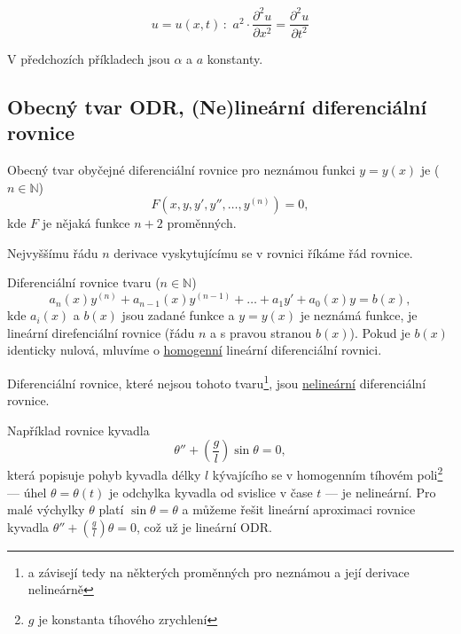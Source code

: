 \documentclass[../main.tex]{subfiles}
\begin{document}
\begin{example}
    \[ u = u(x,t)\, : \,\, a^2\cdot \frac{\partial^2 u}{\partial x^2} = \frac{\partial^2 u}{\partial t^2} \]
\end{example}

\noindent
V předchozích příkladech jsou $\alpha$ a $a$ konstanty.

\subsection{Obecný tvar ODR, (Ne)lineární diferenciální rovnice}

\begin{definition}
    Obecný tvar obyčejné diferenciální rovnice pro neznámou funkci $y = y(x)$ je ($n \in \mathbb{N}$)
    \[ F(x, y, y', y'', \dots, y^{(n)}) = 0, \]
    kde $F$ je nějaká funkce $n+2$ proměnných.
\end{definition}

\begin{definition}
    Nejvyššímu řádu $n$ derivace vyskytujícímu se v rovnici říkáme řád rovnice.
\end{definition}

\begin{definition}
    Diferenciální rovnice tvaru ($n \in \mathbb{N}$)
    \[ a_n(x)y^{(n)} + a_{n-1}(x)y^{(n-1)} + \dots + a_1y' + a_0(x)y = b(x), \]
    kde $a_i(x)$ a $b(x)$ jsou zadané funkce a $y = y(x)$ je neznámá funkce, je
    lineární direfenciální rovnice (řádu $n$ a s pravou stranou $b(x)$).
    Pokud je $b(x)$ identicky nulová, mluvíme o \underline{homogenní} lineární diferenciální rovnici.

    \vspace{3mm}
    \noindent
    Diferenciální rovnice, které nejsou tohoto tvaru\footnote{a závisejí tedy na některých proměnných pro neznámou a její derivace nelineárně},
    jsou \underline{nelineární} diferenciální rovnice.
\end{definition}

\begin{example}
    Například rovnice kyvadla
    \[ \theta'' + \left(\frac{g}{l}\right)\sin\theta = 0, \]
    která popisuje pohyb kyvadla délky $l$ kývajícího se v homogenním tíhovém poli\footnote{$g$ je konstanta tíhového zrychlení}
    --- úhel $\theta = \theta(t)$ je odchylka kyvadla od svislice v čase $t$ --- je nelineární.
    Pro malé výchylky $\theta$ platí $\sin \theta = \theta$ a můžeme řešit lineární aproximaci rovnice kyvadla
    $\theta'' + \left(\frac{g}{l}\right)\theta = 0$, což už je lineární ODR.
\end{example}
\end{document}
